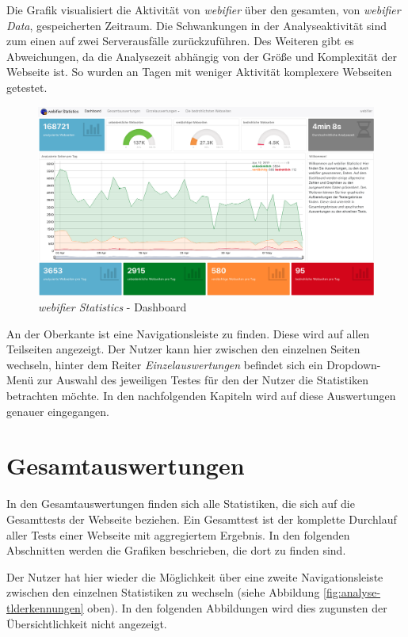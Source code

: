 Die Grafik visualisiert die Aktivität von \textit{webifier} über den gesamten, von \textit{webifier Data}, gespeicherten Zeitraum. Die Schwankungen in der Analyseaktivität sind zum einen auf zwei Serverausfälle zurückzuführen. Des Weiteren gibt es Abweichungen, da die Analysezeit abhängig von der Größe und Komplexität der Webseite ist. So wurden an Tagen mit weniger Aktivität komplexere Webseiten getestet.
\begin{figure}[H]
  \centering
  \includegraphics[width=\textwidth]{images/stats/dashboard}
  \caption[\textit{webifier Statistics} - Dashboard]{\textit{webifier Statistics} - Dashboard\protect\footnotemark}
  \label{fig:analyse-dashboard}
\end{figure}

An der Oberkante ist eine Navigationsleiste zu finden. Diese wird auf allen Teilseiten angezeigt. Der Nutzer kann hier zwischen den einzelnen Seiten wechseln, hinter dem Reiter \textit{Einzelauswertungen} befindet sich ein Dropdown-Menü zur Auswahl des jeweiligen Testes für den der Nutzer die Statistiken betrachten möchte. In den nachfolgenden Kapiteln wird auf diese Auswertungen genauer eingegangen.

\section{Gesamtauswertungen}
In den Gesamtauswertungen finden sich alle Statistiken, die sich auf die Gesamttests der Webseite beziehen. Ein Gesamttest ist der komplette Durchlauf aller Tests einer Webseite mit aggregiertem Ergebnis. In den folgenden Abschnitten werden die Grafiken beschrieben, die dort zu finden sind.

Der Nutzer hat hier wieder die Möglichkeit über eine zweite Navigationsleiste zwischen den einzelnen
Statistiken zu wechseln (siehe Abbildung \ref{fig:analyse-tlderkennungen} oben). In den folgenden
Abbildungen wird dies zugunsten der Übersichtlichkeit nicht angezeigt.

